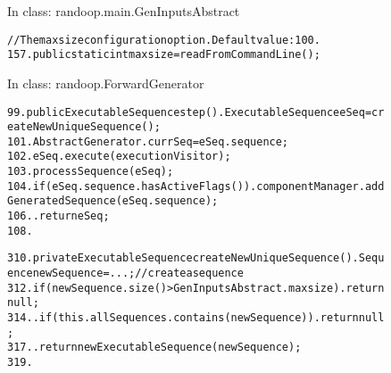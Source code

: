 \begin{figure}[t]
\vspace{-2mm}
\small{In class: randoop.main.GenInputsAbstract}\\
\vspace{-5mm}
\begin{CodeOut}
\begin{alltt}
     //{The maxsize configuration option. Default value: 100.}
157. public static int maxsize = readFromCommandLine(); 
\end{alltt}
\end{CodeOut}

{\small{In class: randoop.ForwardGenerator}}\\
\vspace{-5mm}
\begin{CodeOut}
\begin{alltt}
99.  public ExecutableSequence step() .   ExecutableSequence eSeq = createNewUniqueSequence();
101.   AbstractGenerator.currSeq = eSeq.sequence;
102.   eSeq.execute(executionVisitor);
103.   processSequence(eSeq);
104.   if (eSeq.sequence.hasActiveFlags()) .     componentManager.addGeneratedSequence(eSeq.sequence);
106.   .   return eSeq;
108. \ttrcb

310. private ExecutableSequence createNewUniqueSequence() .   Sequence newSequence = ...; //create a sequence
312.   if (newSequence.size() > GenInputsAbstract.maxsize) .     return null;
314.   .   if (this.allSequences.contains(newSequence)) .     return null;
317.   .   return new ExecutableSequence(newSequence);
319. \ttrcb
\end{alltt}
\end{CodeOut}
\tinystep
\vspace*{-3.0ex}  %
\end{figure}





